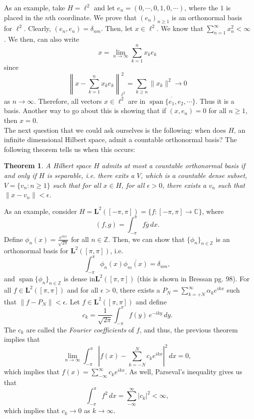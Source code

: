 \documentclass[12pt]{article}
\newtheorem{theorem}{Theorem}
\newcommand{\C}{{\mathbb C}}
\newcommand{\Z}{{\mathbb Z}}
\newcommand{\suml}{\sum\limits}
\newcommand{\sumi}{\sum\limits_{n = 1}^{\infty}}
\newcommand{\sumkn}{\sum\limits_{k = 1}^{n}}
\newcommand{\dint}{\displaystyle\int}
\newcommand{\dintpi}{\dint_{-\pi}^{\pi}}
\newcommand{\ov}{\overline}
\newcommand{\ml}{\mathbf{L}}
\newcommand{\limi}{\lim\limits_{n \to \infty}}
\DeclareMathOperator*{\spa}{span}
\begin{document}
As an example, take $H = \ell^2$ and let $e_n = (0, \cdots, 0, 1, 0, \cdots )$, where the $1$ is placed in the $n$th coordinate. We prove that $(e_n)_{n \geq 1}$ is an orthonormal basis for $\ell^2$. Clearly, $(e_n, e_n) = \delta_{nm}$. Then, let $x \in \ell^2$. We know that $\sumi x_n^2 < \infty$. We then, can also write 
\[ x = \limi \sumkn x_k e_k\]
since 
\[ \left\| x - \sumkn x_k e_k\right\|_{\ell^2}^2 = \sum\limits_{k \geq n} \| x_k \|^2 \to 0\]
as $n \to \infty$. Therefore, all vectors $x \in\ell^2$ are in $\ov{\spa\{e_1, e_2, \cdots \}}$. Thus it is a basis. Another way to go about this is showing that if $(x, e_n) = 0$ for all $n \geq 1$, then $x = 0$. \\
\indent The next question that we could ask ourselves is the following: when does $H$, an infinite dimensional Hilbert space, admit a countable orthonormal basis? The following theorem tells us when this occurs:
\begin{theorem}
A Hilbert space $H$ admits at most a countable orthonormal basis if and only if $H$ is separable, i.e. there exits a $V$, which is a countable dense subset, $V = \{ v_n : n \geq 1 \}$ such that for all $x \in H$, for all $\epsilon > 0$, there exists a $v_n$ such that $\| x - v_n  \| < \epsilon$. 
\end{theorem}
\vspace{-20pt}
As an example, consider $H = \ml^2([-\pi, \pi]) = \{ f: [-\pi, \pi] \to \C \}$, where 
\[ (f, g) = \dintpi f \ov{g} \, dx.\]
Define $\phi_n(x) = \frac{e^{inx}}{\sqrt{2 \pi}}$ for all $n \in \Z$. Then, we can show that $\{ \phi_n \}_{n \in \Z}$ is an orthonormal basis for $\ml^2([\pi, \pi])$, i.e.
\[ \dintpi \phi_n(x) \ov{\phi_m(x)} = \delta_{nm},\]
and $\spa\{ \phi_n \}_{n \in \Z}$ is dense in$ \ml^2([\pi, \pi])$ (this is shown in Bressan pg. 98). For all $f \in \ml^2([\pi, \pi])$ and for all $\epsilon > 0$, there exists a $P_N = \suml_{k = +N}^{\infty} \alpha_k e^{ikx}$ such that $\| f - P_N \| < \epsilon$. Let $f \in \ml^2([\pi, \pi])$ and define 
\[ c_k = \frac{1}{\sqrt{2\pi}} \dintpi f(y) \, e^{-iky} \, dy.\]
The $c_k$ are called the \textit{Fourier coefficients} of $f$, and thus, the previous theorem implies that 
\[ \limi \dintpi \left| f(x) - \suml_{k = -N}^N c_k e^{ikx} \right|^2 \, dx = 0,\]
which implies that $f(x) = \suml_{-\infty}^{\infty} c_k e^{ikx}$. As well, Parseval's inequality gives us that 
\[ \dintpi f^2 \, dx = \suml_{-\infty}^{\infty} |c_k|^2 < \infty,\]
which implies that $c_k \to 0$ as $k \to \infty$. 
\end{document}
